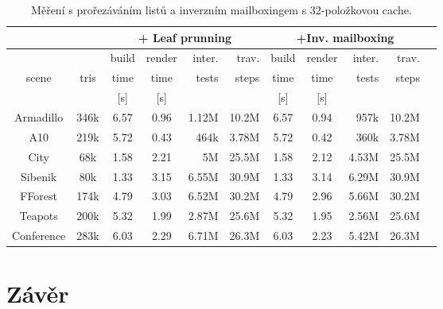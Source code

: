 \documentclass[report,11pt]{elsarticle}
\begin{document}
\begin{table}[t]\footnotesize
\begin{center}
\begin{tabular}{| c |  c || c | c | r | r || c | c | r | r | r}
\hline
\multicolumn{2}{|c||}{} & \multicolumn{4}{|c||}{+ Leaf prunning} &  \multicolumn{4}{|c|}{+Inv. mailboxing}  \\
\hline
          &         &  build       & render  & inter. &   trav.   & build     & render  & inter. &   trav.   \\
scene & tris & time & time    &  tests   & steps  &  time & time    &  tests   & steps \\
          &           &    [s]   &  [s]  &      &      &  [s]    & [s]  &  & \\
\hline
\hline
Armadillo & 346k & 6.57 & 0.96   &  	1.12M		& 10.2M & 6.57	&0.94	 & 957k & 10.2M 	\\ \hline
A10 & 219k  & 5.72 & 0.43  &   		464k		& 3.78M & 5.72	&0.42  & 360k & 3.78M	\\ \hline
City & 68k  &  1.58 & 2.21  & 		5M		& 25.5M & 1.58	&2.12	 & 4.53M	& 25.5M \\ \hline
Sibenik & 80k &  1.33 & 3.15  &		 6.55M	& 30.9M & 1.33	&3.14	 & 6.29M & 30.9M	\\ \hline
FForest & 174k & 4.79 & 3.03  & 		 6.52M	& 30.2M & 4.79	&2.96	 & 5.66M & 30.2M	\\ \hline
Teapots & 200k & 5.32 &  1.99  & 	 2.87M	& 25.6M & 5.32	&1.95	& 2.56M & 25.6M	\\ \hline
Conference & 283k & 6.03 &  2.29  & 	 6.71M	& 26.3M & 6.03	&2.23	& 5.42M & 26.3M	\\ \hline

\end{tabular}
\end{center}
\vspace*{0mm}
\caption{{\label{tab:tab3}}Měření s prořezáváním listů a inverzním mailboxingem s 32-položkovou cache.}
\vspace*{0mm}
\label{shadowtable}
\end{table}

\clearpage
\section{\label{SEC:Conclusion}Závěr}
\end{document}
